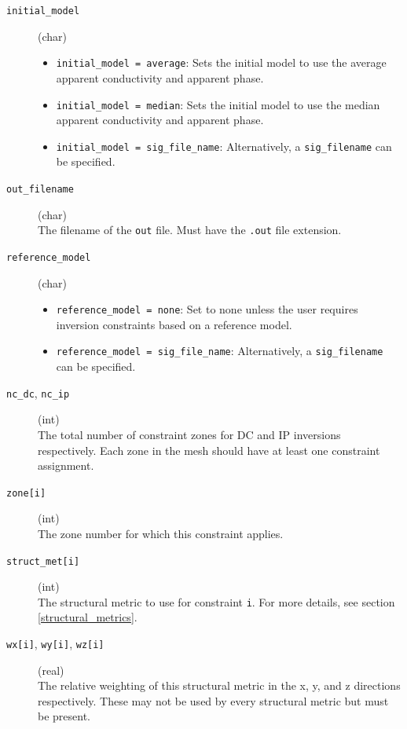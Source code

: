 \documentclass[a4paper,12pt]{article}
\begin{document}
\begin{description}
    \item[\texttt{initial\_model}] (char)\hfill
          \begin{itemize}
              \item \texttt{initial\_model = average}: Sets the initial model to use the average apparent conductivity and apparent phase.
              \item \texttt{initial\_model = median}: Sets the initial model to use the median apparent conductivity and apparent phase.
              \item \texttt{initial\_model = sig\_file\_name}: Alternatively, a \texttt{sig\_filename} can be specified.
          \end{itemize}

    \item[\texttt{out\_filename}] (char)\hfill \\
          The filename of the \texttt{out} file. Must have the \texttt{.out} file extension.

    \item[\texttt{reference\_model}] (char)\hfill
          \begin{itemize}
              \item \texttt{reference\_model = none}: Set to none unless the user requires inversion constraints based on a reference model.
              \item \texttt{reference\_model = sig\_file\_name}: Alternatively, a \texttt{sig\_filename} can be specified.
          \end{itemize}

    \item[\texttt{nc\_dc}, \texttt{nc\_ip}] (int)\hfill \\
          The total number of constraint zones for DC and IP inversions respectively. Each zone in the mesh should have at least one constraint assignment.

    \item[\texttt{zone[i]}] (int)\hfill \\
          The zone number for which this constraint applies.

    \item[\texttt{struct\_met[i]}] (int)\hfill \\
          The structural metric to use for constraint \texttt{i}. For more details, see section \ref{structural_metrics}.

    \item[\texttt{wx[i]}, \texttt{wy[i]}, \texttt{wz[i]}] (real)\hfill \\
          The relative weighting of this structural metric in the x, y, and z directions respectively. These may not be used by every structural metric but must be present.


\end{description}
\end{document}
